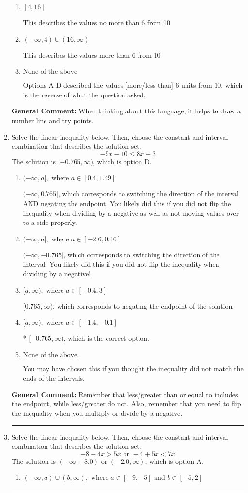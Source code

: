 \documentclass{extbook}[14pt]
\newcommand{\litem}[1]{\item #1

\rule{\textwidth}{0.4pt}}
\begin{document}
\begin{enumerate}
{\begin{enumerate}[label=\Alph*.]
This describes the values less than 6 from 10
\item \( [4, 16] \)

This describes the values no more than 6 from 10
\item \( (-\infty, 4) \cup (16, \infty) \)

This describes the values more than 6 from 10
\item \( \text{None of the above} \)

Options A-D described the values [more/less than] 6 units from 10, which is the reverse of what the question asked.
\end{enumerate}

\textbf{General Comment:} When thinking about this language, it helps to draw a number line and try points.
}
\litem{
Solve the linear inequality below. Then, choose the constant and interval combination that describes the solution set.
\[ -9x -10 \leq 8x + 3 \]
The solution is \( [-0.765, \infty) \), which is option D.\begin{enumerate}[label=\Alph*.]
\item \( (-\infty, a], \text{ where } a \in [0.4, 1.49] \)

 $(-\infty, 0.765]$, which corresponds to switching the direction of the interval AND negating the endpoint. You likely did this if you did not flip the inequality when dividing by a negative as well as not moving values over to a side properly.
\item \( (-\infty, a], \text{ where } a \in [-2.6, 0.46] \)

 $(-\infty, -0.765]$, which corresponds to switching the direction of the interval. You likely did this if you did not flip the inequality when dividing by a negative!
\item \( [a, \infty), \text{ where } a \in [-0.4, 3] \)

 $[0.765, \infty)$, which corresponds to negating the endpoint of the solution.
\item \( [a, \infty), \text{ where } a \in [-1.4, -0.1] \)

* $[-0.765, \infty)$, which is the correct option.
\item \( \text{None of the above}. \)

You may have chosen this if you thought the inequality did not match the ends of the intervals.
\end{enumerate}

\textbf{General Comment:} Remember that less/greater than or equal to includes the endpoint, while less/greater do not. Also, remember that you need to flip the inequality when you multiply or divide by a negative.
}
\litem{
Solve the linear inequality below. Then, choose the constant and interval combination that describes the solution set.
\[ -8 + 4 x > 5 x \text{ or } -4 + 5 x < 7 x \]
The solution is \( (-\infty, -8.0) \text{ or } (-2.0, \infty) \), which is option A.\begin{enumerate}[label=\Alph*.]
\item \( (-\infty, a) \cup (b, \infty), \text{ where } a \in [-9, -5] \text{ and } b \in [-5, 2] \)


\end{enumerate}}
\end{enumerate}
\end{document}
